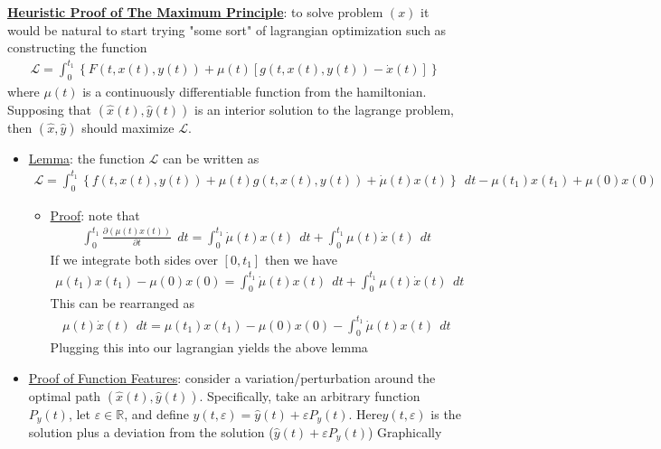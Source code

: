 \documentclass{article}
\begin{document}
\vspace{2.5mm}
\par \underline{\bf{Heuristic Proof of The Maximum Principle}}: to solve problem $(x)$ it would be natural to start trying "some sort" of lagrangian optimization such as constructing the function \begin{gather*} \mathcal{L} = \int_{0}^{t_{1}} \left\{F(t, x(t), y(t)) + \mu(t)[g(t,x(t), y(t)) - \dot{x}(t)] \right\} \end{gather*} where $\mu(t)$ is a continuously differentiable function from the hamiltonian. Supposing that $(\widehat{x}(t), \widehat{y}(t))$ is an interior solution to the lagrange problem, then $(\widehat{x}, \widehat{y})$ should maximize $\mathcal{L}$.
\begin{itemize}
    \item \underline{Lemma}: the function $\mathcal{L}$ can be written as \begin{gather*} \mathcal{L} = \int_{0}^{t_{1}} \left\{ f(t,x(t),y(t)) + \mu(t)g(t,x(t),y(t)) + \dot{\mu}(t)x(t) \right\} \ \ dt - \mu(t_{1})x(t_{1}) + \mu(0) x(0) \end{gather*}
    \begin{itemize}
        \item \underline{Proof}: note that
        \begin{gather*} \int_{0}^{t_{1}} \tfrac{\partial (\mu(t)x(t))}{\partial t} \ \ dt = \int_{0}^{t_{1}} \dot{\mu}(t)x(t) \ \ dt + \int_{0}^{t_{1}} \mu(t)\dot{x}(t) \ \ dt
        \end{gather*}
        If we integrate both sides over $[0, t_{1}]$ then we have
        \begin{gather*}
            \mu(t_{1})x(t_{1}) - \mu(0)x(0) = \int_{0}^{t_{1}} \dot{\mu}(t) x(t) \ \ dt + \int_{0}^{t_{1}} \mu(t)\dot{x}(t) \ \ dt
        \end{gather*}
        This can be rearranged as
        \begin{gather*} \mu(t)\dot{x}(t) \ \ dt = \mu(t_{1})x(t_{1}) - \mu(0)x(0) - \int_{0}^{t_{1}} \dot{\mu}(t)x(t) \ \ dt
        \end{gather*}
        Plugging this into our lagrangian yields the above lemma
    \end{itemize}
    \item \underline{Proof of Function Features}: consider a variation/perturbation around the optimal path $(\widehat{x}(t), \widehat{y}(t))$. Specifically, take an arbitrary function $P_{y}(t)$, let $\varepsilon \in \mathbb{R}$, and define $y(t, \varepsilon) = \widehat{y}(t) + \varepsilon P_{y}(t)$. Here$y(t, \varepsilon)$ is the solution plus a deviation from the solution ($\widehat{y}(t) + \varepsilon P_{y}(t)$) Graphically

\end{itemize}
\end{document}
